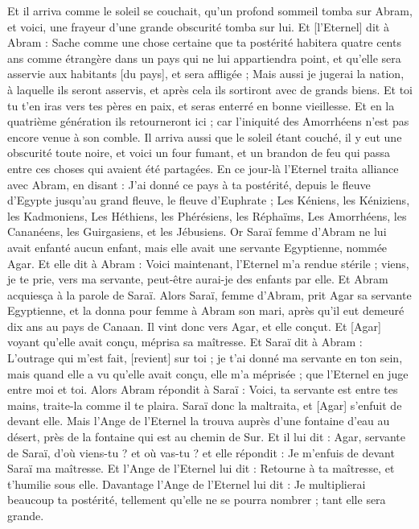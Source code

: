 \begin{multicols}{2}
Et il arriva comme le soleil se couchait, qu'un profond sommeil tomba sur Abram, et voici, une frayeur d'une grande obscurité tomba sur lui.
Et [l'Eternel] dit à Abram : Sache comme une chose certaine que ta postérité habitera quatre cents ans comme étrangère dans un pays qui ne lui appartiendra point, et qu'elle sera asservie aux habitants [du pays], et sera affligée ;
Mais aussi je jugerai la nation, à laquelle ils seront asservis, et après cela ils sortiront avec de grands biens.
Et toi tu t'en iras vers tes pères en paix, et seras enterré en bonne vieillesse.
Et en la quatrième génération ils retourneront ici ; car l'iniquité des Amorrhéens n'est pas encore venue à son comble.
Il arriva aussi que le soleil étant couché, il y eut une obscurité toute noire, et voici un four fumant, et un brandon de feu qui passa entre ces choses qui avaient été partagées.
En ce jour-là l'Eternel traita alliance avec Abram, en disant : J'ai donné ce pays à ta postérité, depuis le fleuve d'Egypte jusqu'au grand fleuve, le fleuve d'Euphrate ;
Les Kéniens, les Kéniziens, les Kadmoniens,
Les Héthiens, les Phérésiens, les Réphaïms,
Les Amorrhéens, les Cananéens, les Guirgasiens, et les Jébusiens.
\VerseOne{}Or Saraï femme d'Abram ne lui avait enfanté aucun enfant, mais elle avait une servante Egyptienne, nommée Agar.
Et elle dit à Abram : Voici maintenant, l'Eternel m'a rendue stérile ; viens, je te prie, vers ma servante, peut-être aurai-je des enfants par elle. Et Abram acquiesça à la parole de Saraï.
Alors Saraï, femme d'Abram, prit Agar sa servante Egyptienne, et la donna pour femme à Abram son mari, après qu'il eut demeuré dix ans au pays de Canaan.
Il vint donc vers Agar, et elle conçut. Et [Agar] voyant qu'elle avait conçu, méprisa sa maîtresse.
Et Saraï dit à Abram : L'outrage qui m'est fait, [revient] sur toi ; je t'ai donné ma servante en ton sein, mais quand elle a vu qu'elle avait conçu, elle m'a méprisée ; que l'Eternel en juge entre moi et toi.
Alors Abram répondit à Saraï : Voici, ta servante est entre tes mains, traite-la comme il te plaira. Saraï donc la maltraita, et [Agar] s'enfuit de devant elle.
Mais l'Ange de l'Eternel la trouva auprès d'une fontaine d'eau au désert, près de la fontaine qui est au chemin de Sur.
Et il lui dit : Agar, servante de Saraï, d'où viens-tu ? et où vas-tu ? et elle répondit : Je m'enfuis de devant Saraï ma maîtresse.
Et l'Ange de l'Eternel lui dit : Retourne à ta maîtresse, et t'humilie sous elle.
Davantage l'Ange de l'Eternel lui dit : Je multiplierai beaucoup ta postérité, tellement qu'elle ne se pourra nombrer ; tant elle sera grande.

\end{multicols}
